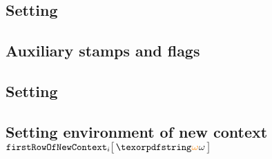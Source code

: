 \subsection{Setting \stackJUMPDESTINATIONVETTING{}                                 \lispDone{}}  \label{hub: generalities: setting the jump destination vetting flag}       
\subsection{Auxiliary stamps and flags                                             \lispDone{}}  \label{hub: generalities: auxiliary stamps and flags}                      
\subsection{Setting \txEndStamp{}                                                  \lispDone{}}  \label{hub: generalities: tx end stamp}                                    
\subsection{Setting environment of new context $\firstRowOfNewContext {i}{\relof}$ \lispDone{}}  \label{hub: generalities: first row of new context}                        

